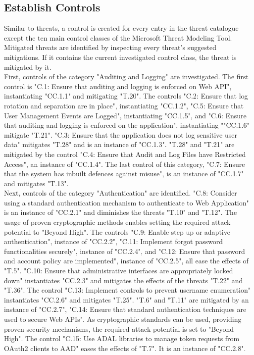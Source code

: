 \subsection{Establish Controls}
Similar to threats, a control is created for every entry in the threat catalogue except the ten main control classes of the Microsoft Threat Modeling Tool. Mitigated threats are identified by inspecting every threat’s suggested mitigations. If it contains the current investigated control class, the threat is mitigated by it.\\
\newline
First, controls of the category "Auditing and Logging" are investigated. The first control is "C.1: Ensure that auditing and logging is enforced on Web API", instantiating "CC.1.1" and mitigating "T.20". The controls "C.2: Ensure that log rotation and separation are in place", instantiating "CC.1.2", "C.5: Ensure that User Management Events are Logged", instantiating "CC.1.5", and "C.6: Ensure that auditing and logging is enforced on the application", instantiating ""CC.1.6" mitigate "T.21". "C.3: Ensure that the application does not log sensitive user data" mitigates "T.28" and is an instance of "CC.1.3". "T.28" and "T.21" are mitigated by the control "C.4: Ensure that Audit and Log Files have Restricted Access", an instance of "CC.1.4". The last control of this category, "C.7: Ensure that the system has inbuilt defences against misuse", is an instance of "CC.1.7" and mitigates "T.13". \\
\newline
Next, controls of the category "Authentication" are identified. "C.8: Consider using a standard authentication mechanism to authenticate to Web Application" is an instance of "CC.2.1" and diminishes the threats "T.10" and "T.12". The usage of proven cryptographic methods enables setting the required attack potential to "Beyond High". The controls "C.9: Enable step up or adaptive authentication", instance of "CC.2.2", "C.11: Implement forgot password functionalities securely", instance of "CC.2.4", and "C.12: Ensure that password and account policy are implemented", instance of "CC.2.5", all ease the effects of "T.5". "C.10: Ensure that administrative interfaces are appropriately locked down" instantiates "CC.2.3" and mitigates the effects of the threats "T.22" and "T.36". The control "C.13: Implement controls to prevent username enumeration" instantiates "CC.2.6" and mitigates "T.25". "T.6" and "T.11" are mitigated by an instance of "CC.2.7", "C.14: Ensure that standard authentication techniques are used to secure Web APIs". As cryptographic standards can be used, providing proven security mechanisms, the required attack potential is set to "Beyond High". The control "C.15: Use ADAL libraries to manage token requests from OAuth2 clients to AAD" eases the effects of "T.7". It is an instance of "CC.2.8". \\
